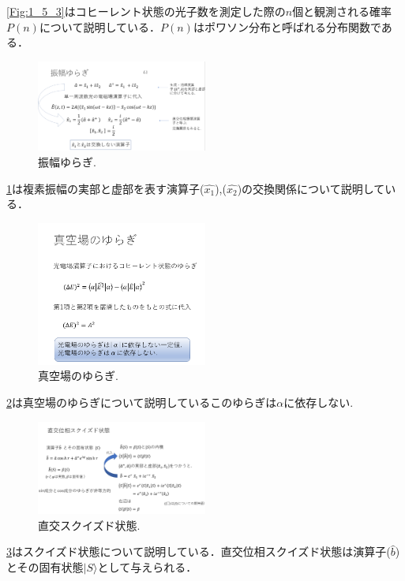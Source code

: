 \documentclass[a4j,twocolumn]{jarticle}
\def \figref #1{\figurename\ref{#1}}
\begin{document}
    \figref{Fig:1_5_3}はコヒーレント状態の光子数を測定した際の$n$個と観測される確率$P(n)$について説明している．$P(n)$はポワソン分布と呼ばれる分布関数である．

\begin{figure}[htbp]
        \centering   
        \includegraphics[width=0.5\textwidth]{img/zemi12.png}
        \caption[sample image (png)]{振幅ゆらぎ.}
        \label{Fig:1_5_4}
    \end{figure}

    \figref{Fig:1_5_4}は複素振幅の実部と虚部を表す演算子($\hat{x_1}$),($\hat{x_2}$)の交換関係について説明している．

\begin{figure}[htbp]
        \centering   
        \includegraphics[width=0.5\textwidth]{img/zemi13.png}
        \caption[sample image (png)]{真空場のゆらぎ.}
        \label{Fig:1_5_5}
    \end{figure}
    \figref{Fig:1_5_5}は真空場のゆらぎについて説明しているこのゆらぎは$α$に依存しない.
    
\begin{figure}[htbp]
        \centering   
        \includegraphics[width=0.5\textwidth]{img/zemi14.png}
        \caption[sample image (png)]{直交スクイズド状態.}
        \label{Fig:1_5_6}
    \end{figure}
    \figref{Fig:1_5_6}はスクイズド状態について説明している．直交位相スクイズド状態は演算子($\hat{b}$)とその固有状態$|{S}\rangle$として与えられる．
    
\end{document}
